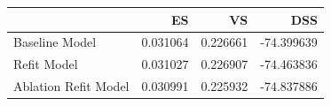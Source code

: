 \begin{tabular}{lrrr}
\toprule
 & ES & VS & DSS \\
\midrule
Baseline Model & 0.031064 & 0.226661 & -74.399639 \\
Refit Model & 0.031027 & 0.226907 & -74.463836 \\
Ablation Refit Model & 0.030991 & 0.225932 & -74.837886 \\
\bottomrule
\end{tabular}
